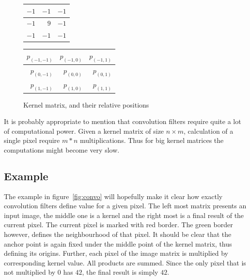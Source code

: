 \documentclass{article}
\begin{document}
\begin{figure}



  \centering

	\begin{tabular}{| r | r | r |}
	\hline
		$-1$ & $-1$ & $-1$ \\
	\hline
		$-1$ & $9$ & $-1$ \\
	\hline
		$-1$ & $-1$ & $-1$ \\
	\hline

	\end{tabular}

	\begin{tabular}{| r | r | r |}
	\hline
		$p_{(-1,-1)}$ & $p_{(-1,0)}$ & $p_{(-1,1)}$ \\
	\hline
		$p_{(0,-1)}$ & $p_{(0,0)}$ & $p_{(0,1)}$ \\
	\hline
		$p_{(1,-1)}$ & $p_{(1,0)}$ & $p_{(1,1)}$ \\
	\hline

	\end{tabular}
  
  {
  \caption{Kernel matrix, and their relative positions}
  \label{fig:anchor}
  }



\end{figure}



It is probably appropriate to mention that convolution filters require quite a lot of computational power. Given a kernel matrix of size $n \times m$, calculation of a single pixel require $m*n$ multiplications. Thus for big kernel matrices the computations might become very slow.

\subsection{Example}

The example in figure~\ref{fig:convo} will hopefully make it clear how exactly convolution filters define value for a given pixel. The left most matrix presents an input image, the middle one is a kernel and the right most is a final result of the current pixel. The current pixel is marked with red border. The green border however, defines the neighbourhood of that pixel. It should be clear that the anchor point is again fixed under the middle point of the kernel matrix, thus defining its origins. Further, each pixel of the image matrix is multiplied by corresponding kernel value. All products are summed. Since the only pixel that is not multiplied by $0$ has $42$, the final result is simply $42$.
\end{document}
